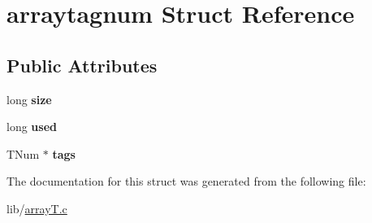 \hypertarget{structarraytagnum}{}\section{arraytagnum Struct Reference}
\label{structarraytagnum}
\subsection*{Public Attributes}
\begin{DoxyCompactItemize}
\item 
long {\bfseries size}\hypertarget{structarraytagnum_af422161be6f3cc894fa3b171ff9f4f8b}{}\label{structarraytagnum_af422161be6f3cc894fa3b171ff9f4f8b}

\item 
long {\bfseries used}\hypertarget{structarraytagnum_ad4468371ac12208b0fd5f3fdb1678c19}{}\label{structarraytagnum_ad4468371ac12208b0fd5f3fdb1678c19}

\item 
T\+Num $\ast$ {\bfseries tags}\hypertarget{structarraytagnum_ad8ba5aa2dc3010ea277c465ee099bd2e}{}\label{structarraytagnum_ad8ba5aa2dc3010ea277c465ee099bd2e}

\end{DoxyCompactItemize}


The documentation for this struct was generated from the following file\+:\begin{DoxyCompactItemize}
\item 
lib/\hyperlink{arrayT_8c}{array\+T.\+c}\end{DoxyCompactItemize}
